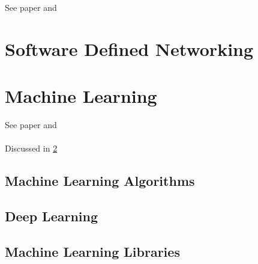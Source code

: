See paper \cite{Iglesias2015} and  \cite{Velan2016} \\

\lipsum


\section{Software Defined Networking}
\label{sec:sdn}

\lipsum


\section{Machine Learning}
\label{sec:machine-learning}

See paper \cite{Khraisat2019} and \cite{Hodo2017} \\

\lipsum \\
Discussed in \ref{sec:machine-learning}


\subsection{Machine Learning Algorithms}
\label{subsec:ml-algorithms}

\lipsum


\subsection{Deep Learning}
\label{subsec:deep-learning}

\lipsum


\subsection{Machine Learning Libraries}
\label{subsec:ml-libraries}

